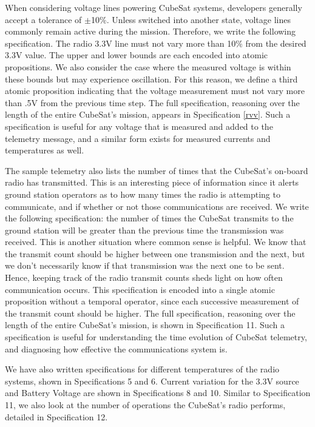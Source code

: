 \documentclass[conf]{new-aiaa}
\begin{document}
When considering voltage lines powering CubeSat systems, developers generally accept a tolerance of $\pm$10$\%$. Unless switched into another state, voltage lines commonly remain active during the mission. Therefore, we write the following specification. The radio 3.3V line must not vary more than 10$\%$ from the desired 3.3V value. The upper and lower bounds are each encoded into atomic propositions. We also consider the case where the measured voltage is within these bounds but may experience oscillation. For this reason, we define a third atomic proposition indicating that the voltage measurement must not vary more than .5V from the previous time step. The full specification, reasoning over the length of the entire CubeSat's mission, appears in Specification \ref{rvv}. Such a specification is useful for any voltage that is measured and added to the telemetry message, and a similar form exists for measured currents and temperatures as well.

The sample telemetry also lists the number of times that the CubeSat's on-board radio has transmitted. This is an interesting piece of information since it alerts ground station operators as to how many times the radio is attempting to communicate, and if whether or not those communications are received. We write the following specification: the number of times the CubeSat transmits to the ground station will be greater than the previous time the transmission was received. This is another situation where common sense is helpful. We know that the transmit count should be higher between one transmission and the next, but we don't necessarily know if that transmission was the next one to be sent. Hence, keeping track of the radio transmit counts sheds light on how often communication occurs. This specification is encoded into a single atomic proposition without a temporal operator, since each successive measurement of the transmit count should be higher. The full specification, reasoning over the length of the entire CubeSat's mission, is shown in Specification 11. Such a specification is useful for understanding the time evolution of CubeSat telemetry, and diagnosing how effective the communications system is.

We have also written specifications for different temperatures of the radio systems, shown in Specifications 5 and 6. Current variation for the 3.3V source and Battery Voltage are shown in Specifications 8 and 10. Similar to Specification 11, we also look at the number of operations the CubeSat's radio performs, detailed in Specification 12.
\end{document}
